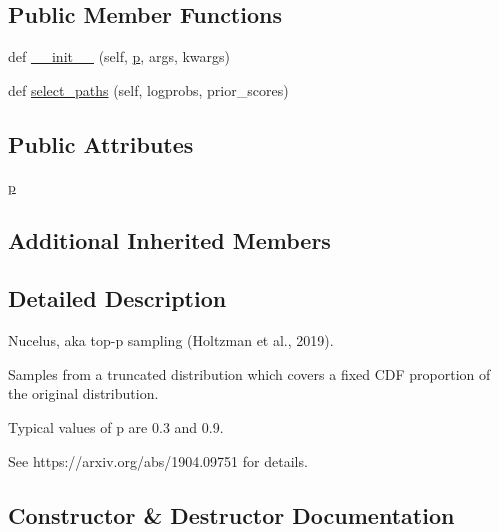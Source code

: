 \subsection*{Public Member Functions}
\begin{DoxyCompactItemize}
\item 
def \hyperlink{classparlai_1_1core_1_1torch__generator__agent_1_1NucleusSampling_a90c444c7fa1f76baac3a54fc7c980e15}{\+\_\+\+\_\+init\+\_\+\+\_\+} (self, \hyperlink{classparlai_1_1core_1_1torch__generator__agent_1_1NucleusSampling_a54a43b58e2e2cf7da776c40311e0a3c1}{p}, args, kwargs)
\item 
def \hyperlink{classparlai_1_1core_1_1torch__generator__agent_1_1NucleusSampling_a91abde2fb2dccf5cd0564825ddc5ea4d}{select\+\_\+paths} (self, logprobs, prior\+\_\+scores)
\end{DoxyCompactItemize}
\subsection*{Public Attributes}
\begin{DoxyCompactItemize}
\item 
\hyperlink{classparlai_1_1core_1_1torch__generator__agent_1_1NucleusSampling_a54a43b58e2e2cf7da776c40311e0a3c1}{p}
\end{DoxyCompactItemize}
\subsection*{Additional Inherited Members}


\subsection{Detailed Description}
\begin{DoxyVerb}Nucelus, aka top-p sampling (Holtzman et al., 2019).

Samples from a truncated distribution which covers a fixed CDF proportion
of the original distribution.

Typical values of p are 0.3 and 0.9.

See https://arxiv.org/abs/1904.09751 for details.
\end{DoxyVerb}
 

\subsection{Constructor \& Destructor Documentation}
\mbox{\label{classparlai_1_1core_1_1torch__generator__agent_1_1NucleusSampling_a90c444c7fa1f76baac3a54fc7c980e15}} 
